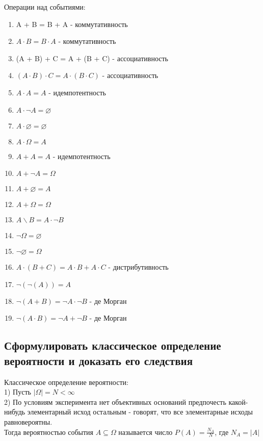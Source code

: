 Операции над событиями:
\begin{enumerate}
\item A + B = B + A - коммутативность
\item $A \cdot B = B \cdot A$ - коммутативность
\item (A + B) + C = A + (B + C) - ассоциативность
\item $(A \cdot B) \cdot C = A \cdot (B \cdot C)$ - ассоциативность
\item $A \cdot A = A$ - идемпотентность
\item $A \cdot \neg A = \varnothing$
\item $A \cdot \varnothing = \varnothing$
\item $A \cdot \Omega = A$
\item $ A + A = A$ - идемпотентность
\item $A + \neg A = \Omega$
\item $A + \varnothing = A$
\item $A + \Omega = \Omega$
\item $A \backslash B = A \cdot \neg B$
\item $\neg \Omega = \varnothing$
\item $\neg \varnothing = \Omega$
\item $A \cdot (B + C) = A \cdot B + A \cdot C$ - дистрибутивность
\item $\neg(\neg(A)) = A$
\item $\neg(A + B) = \neg A \cdot \neg B$ - де Морган
\item $\neg(A \cdot B) = \neg A + \neg B$ - де Морган
\end{enumerate}

\subsection{Сформулировать классическое определение вероятности и доказать его следствия}

Классическое определение вероятности:\\
1) Пусть $|\Omega| = N < \infty$\\
2) По условиям эксперимента нет объективных оснований предпочесть какой-нибудь элементарный исход остальным - говорят, что все элементарные исходы равновероятны.\\
Тогда вероятностью события $A \subseteq \Omega$ называется число $P(A) = \frac{N_{A}}{N}$, где $N_{A} = |A|$\\

